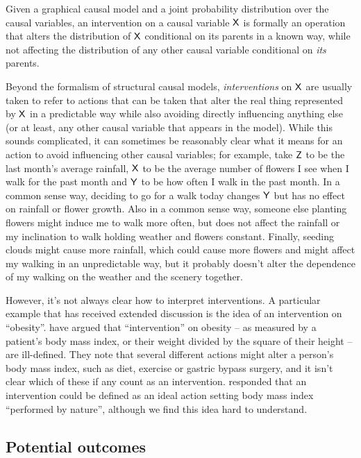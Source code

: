 Given a graphical causal model and a joint probability distribution over the causal variables, an intervention on a causal variable $\mathsf{X}$ is formally an operation that alters the distribution of $\mathsf{X}$ conditional on its parents in a known way, while not affecting the distribution of any other causal variable conditional on \emph{its} parents.

Beyond the formalism of structural causal models, \emph{interventions} on $\mathsf{X}$ are usually taken to refer to actions that can be taken that alter the real thing represented by $\mathsf{X}$ in a predictable way while also avoiding directly influencing anything else (or at least, any other causal variable that appears in the model). While this sounds complicated, it can sometimes be reasonably clear what it means for an action to avoid influencing other causal variables; for example, take $\mathsf{Z}$ to be the last month's average rainfall, $\mathsf{X}$ to be the average number of flowers I see when I walk for the past month and $\mathsf{Y}$ to be how often I walk in the past month. In a common sense way, deciding to go for a walk today changes $\mathsf{Y}$ but has no effect on rainfall or flower growth. Also in a common sense way, someone else planting flowers might induce me to walk more often, but does not affect the rainfall or my inclination to walk holding weather and flowers constant. Finally, seeding clouds might cause more rainfall, which could cause more flowers and might affect my walking in an unpredictable way, but it probably doesn't alter the dependence of my walking on the weather and the scenery together. 

However, it's not always clear how to interpret interventions. A particular example that has received extended discussion is the idea of an intervention on ``obesity''. \citet{hernan_does_2008,noauthor_does_2016} have argued that ``intervention'' on obesity -- as measured by a patient's body mass index, or their weight divided by the square of their height -- are ill-defined. They note that several different actions might alter a person's body mass index, such as diet, exercise or gastric bypass surgery, and it isn't clear which of these if any count as an intervention. \citet{pearl_does_2018} responded that an intervention could be defined as an ideal action setting body mass index ``performed by nature'', although we find this idea hard to understand. 

\subsection{Potential outcomes}

